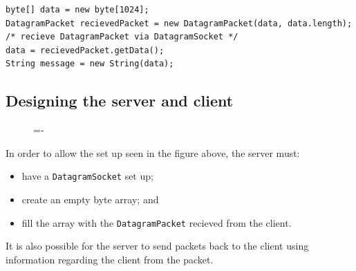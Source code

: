 \documentclass[a4paper]{systems-software}
\begin{document}
\begin{lstlisting}[title={Server: receiving a DatagramPacket.}]
byte[] data = new byte[1024];
DatagramPacket recievedPacket = new DatagramPacket(data, data.length);
/* recieve DatagramPacket via DatagramSocket */
data = recievedPacket.getData();
String message = new String(data);
\end{lstlisting}


\subsection*{Designing the server and client}

\begin{figure}[H]
	\lineskip=-\fboxrule
\end{figure}

In order to allow the set up seen in the figure above, the server must:
\begin{itemize}
	\item have a \texttt{DatagramSocket} set up;
	\item create an empty byte array; and
	\item fill the array with the \texttt{DatagramPacket} recieved from the client.
\end{itemize}
It is also possible for the server to send packets back to the client using information regarding the client from the packet.
\end{document}

